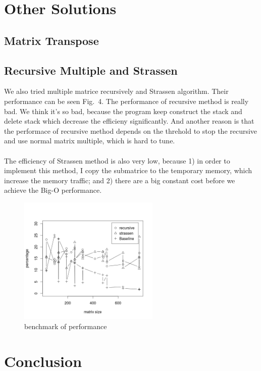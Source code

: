 \documentclass[10pt]{article}
\begin{document}
\section{Other Solutions}
\subsection{Matrix Transpose}
\subsection{Recursive Multiple and Strassen}
We also tried multiple matrice recursively and Strassen algorithm. Their performance can be seen Fig.~4. The performance of recursive method is really bad. We think it's so bad, because the program keep construct the stack and delete stack which decrease the efficieny significantly. And another reason is that the performace of recursive method depends on the threhold to stop the recursive and use normal matrix multiple, which is hard to tune. \\
\\
The efficiency of Strassen method is also very low, because 1) in order to implement this method, I copy the submatrice to the temporary memory, which increase the memory traffic; and 2) there are a big constant cost before we achieve the Big-O performance.   

\begin{figure}[h!]
  \centering
      \includegraphics[width=0.6\textwidth]{result_2.jpeg}
  \caption{benchmark of performance}
\end{figure}
\section{Conclusion}
\end{document}
